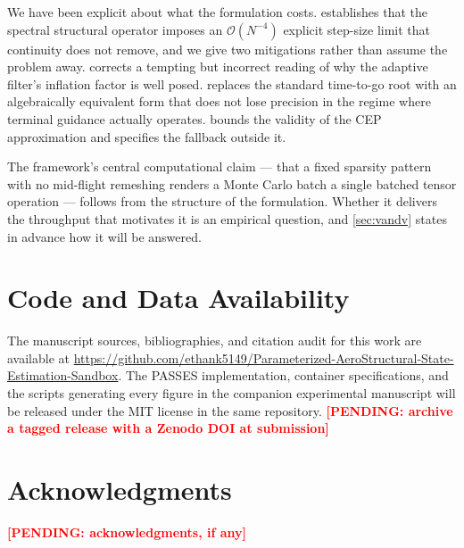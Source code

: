 \documentclass[11pt,a4paper]{article}
\theoremstyle{definition}
\numberwithin{equation}{section}
\newcommand{\PENDING}[1]{\textcolor{red}{\textbf{[PENDING: #1]}}}
\begin{document}
We have been explicit about what the formulation costs.  establishes that the spectral structural operator imposes an $\mathcal{O}(N^{-4})$ explicit step-size limit that continuity does not remove, and we give two mitigations rather than assume the problem away.  corrects a tempting but incorrect reading of why the adaptive filter's inflation factor is well posed.  replaces the standard time-to-go root with an algebraically equivalent form that does not lose precision in the regime where terminal guidance actually operates.  bounds the validity of the CEP approximation and specifies the fallback outside it.

The framework's central computational claim --- that a fixed sparsity pattern with no mid-flight remeshing renders a Monte Carlo batch a single batched tensor operation --- follows from the structure of the formulation. Whether it delivers the throughput that motivates it is an empirical question, and \cref{sec:vandv} states in advance how it will be answered.

\section*{Code and Data Availability}

The manuscript sources, bibliographies, and citation audit for this work are available at \url{https://github.com/ethank5149/Parameterized-AeroStructural-State-Estimation-Sandbox}. The PASSES implementation, container specifications, and the scripts generating every figure in the companion experimental manuscript will be released under the MIT license in the same repository. \PENDING{archive a tagged release with a Zenodo DOI at submission}

\section*{Acknowledgments}

\PENDING{acknowledgments, if any}

\pagebreak

\printbibliography
{}

\pagebreak
\end{document}
